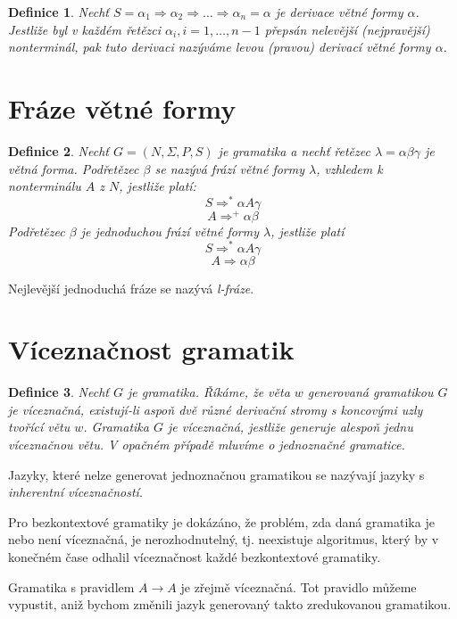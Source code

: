 \documentclass[a4paper, 11pt]{report}
\newtheorem{mydef}{Definice}[chapter]
\begin{document}
\begin{mydef}
Nechť $S = \alpha_1 \Rightarrow \alpha_2 \Rightarrow \dots \Rightarrow \alpha_n = \alpha$ je derivace větné formy $\alpha$. Jestliže byl v každém řetězci $\alpha_i, i = 1, \dots, n-1$ přepsán nelevější (nejpravější) nonterminál, pak tuto derivaci nazýváme levou (pravou) derivací větné formy $\alpha$.
\end{mydef}

\section{Fráze větné formy}
\begin{mydef}
Nechť $G = (N, \Sigma, P, S)$ je gramatika a nechť řetězec $\lambda = \alpha \beta \gamma$ je větná forma. Podřetězec $\beta$ se nazývá \emph{frází větné formy} $\lambda$, vzhledem k nonterminálu $A$ z $N$, jestliže platí:
$$S \Rightarrow^* \alpha A \gamma$$
$$A \Rightarrow^+ \alpha \beta$$
Podřetězec $\beta$ je \emph{jednoduchou frází větné formy} $\lambda$, jestliže platí
$$S \Rightarrow^* \alpha A \gamma$$
$$A \Rightarrow \alpha \beta$$
\end{mydef}

Nejlevější jednoduchá fráze se nazývá \emph{l-fráze}.

\section{Víceznačnost gramatik}

\begin{mydef}
Nechť $G$ je gramatika. Říkáme, že věta $w$ generovaná gramatikou $G$ je víceznačná, existují-li aspoň dvě různé derivační stromy s koncovými uzly tvořící větu $w$.
\emph{Gramatika $G$ je víceznačná}, jestliže generuje alespoň jednu víceznačnou větu. V opačném případě mluvíme o jednoznačné gramatice.
\end{mydef}

Jazyky, které nelze generovat jednoznačnou gramatikou se nazývají jazyky s \emph{inherentní víceznačností}.

Pro bezkontextové gramatiky je dokázáno, že problém, zda daná gramatika je nebo není víceznačná, je nerozhodnutelný, tj. neexistuje algoritmus, který by v konečném čase odhalil víceznačnost každé bezkontextové gramatiky.

Gramatika s pravidlem $A \to A$ je zřejmě víceznačná. Tot pravidlo můžeme vypustit, aniž bychom změnili jazyk generovaný takto zredukovanou gramatikou.
\end{document}

